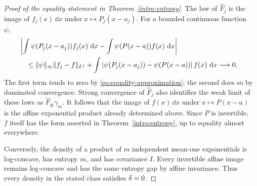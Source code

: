 \begin{proof}[Proof of the equality statement in Theorem~\ref{intro:entropy}]
The law of $\widehat F_j$ is the image of $f_j(x)\,\dd x$ under
$x\mapsto P_j(x-a_j)$.  For a bounded continuous function $\psi$,
\begin{align*}
 &\left|\int\psi(P_j(x-a_j))f_j(x)\,\,\mathrm d x
       -\int\psi(P(x-a))f(x)\,\,\mathrm d x\right|\\
 &\quad\le\lVert \psi\rVert_{\infty}\lVert f_j-f\rVert_{L^1}
     +\int\left|\psi(P_j(x-a_j))-\psi(P(x-a))\right|f(x)\,\,\mathrm d x
     \longrightarrow0.
\end{align*}
The first term tends to zero by \eqref{eq:equality-approximation};
the second does so by dominated convergence.  Strong convergence of
$\widehat F_j$ also identifies the weak limit of these laws as
$\widehat F_\#\gamma_m$.  It follows that the image of $f(x)\,\dd x$
under $x\mapsto P(x-a)$ is the affine exponential product already
determined above.  Since $P$ is invertible, $f$ itself has the form
asserted in Theorem~\ref{intro:entropy}, up to equality almost everywhere.

Conversely, the density of a product of $m$ independent mean-one
exponentials is log-concave, has entropy $m$, and has covariance $I$.
Every invertible affine image remains log-concave and has the same
entropy gap by affine invariance.  Thus every density in the stated
class satisfies $\delta=0$.
\end{proof}

